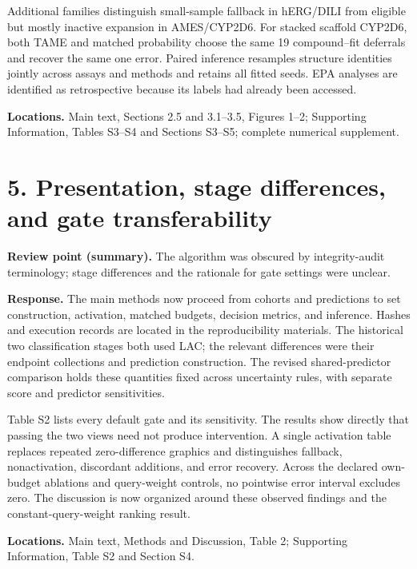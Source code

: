 Additional families distinguish small-sample fallback in hERG/DILI from eligible but mostly inactive expansion in AMES/CYP2D6. For stacked scaffold CYP2D6, both TAME and matched probability choose the same 19 compound--fit deferrals and recover the same one error. Paired inference resamples structure identities jointly across assays and methods and retains all fitted seeds. EPA analyses are identified as retrospective because its labels had already been accessed.

\textbf{Locations.} Main text, Sections 2.5 and 3.1--3.5, Figures 1--2; Supporting Information, Tables S3--S4 and Sections S3--S5; complete numerical supplement.

\section*{5. Presentation, stage differences, and gate transferability}
\noindent\textbf{Review point (summary).} The algorithm was obscured by integrity-audit terminology; stage differences and the rationale for gate settings were unclear.

\textbf{Response.} The main methods now proceed from cohorts and predictions to set construction, activation, matched budgets, decision metrics, and inference. Hashes and execution records are located in the reproducibility materials. The historical two classification stages both used LAC; the relevant differences were their endpoint collections and prediction construction. The revised shared-predictor comparison holds these quantities fixed across uncertainty rules, with separate score and predictor sensitivities.

Table S2 lists every default gate and its sensitivity. The results show directly that passing the two views need not produce intervention. A single activation table replaces repeated zero-difference graphics and distinguishes fallback, nonactivation, discordant additions, and error recovery. Across the declared own-budget ablations and query-weight controls, no pointwise error interval excludes zero. The discussion is now organized around these observed findings and the constant-query-weight ranking result.

\textbf{Locations.} Main text, Methods and Discussion, Table 2; Supporting Information, Table S2 and Section S4.

